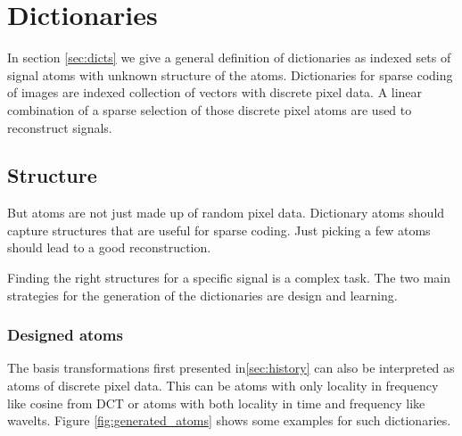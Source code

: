 \chapter{Dictionaries}
In section \ref{sec:dicts} we give a general definition of dictionaries 
as indexed sets of signal atoms with unknown structure of the atoms.
Dictionaries for sparse coding of images are indexed collection of vectors with
discrete pixel data. A linear combination of a sparse selection of those
discrete pixel atoms are used to reconstruct signals. 

\section{Structure}
But atoms are not just made up of random pixel data. Dictionary atoms should
capture structures that are useful for sparse coding. Just picking a few atoms
should lead to a good reconstruction. 

Finding the right structures for a specific signal is a complex task.
The two main strategies for the generation of the dictionaries are design and
learning.

\subsection{Designed atoms}
The basis transformations first presented in\ref{sec:history} can also
be interpreted as atoms of discrete pixel data. This can be atoms with only
locality in frequency like cosine from DCT or atoms with both locality in time
and frequency like wavelts. Figure \ref{fig:generated_atoms}
shows some examples for such dictionaries. 


